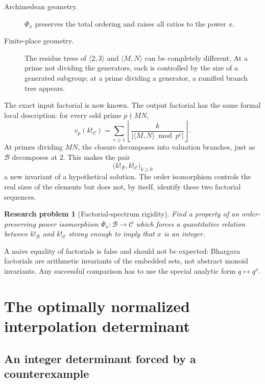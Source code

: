\documentclass[11pt,oneside]{article}
\newtheorem{problem}[theorem]{Research problem}
\theoremstyle{definition}
\theoremstyle{remark}
\newcommand{\B}{\mathcal B}
\newcommand{\Cout}{\mathcal C}
\newcommand{\floor}[1]{\left\lfloor #1\right\rfloor}
\begin{document}
\begin{description}
\item[Archimedean geometry.] \(\Phi_x\) preserves the total ordering and raises all ratios to
the power \(x\).
\item[Finite-place geometry.] The residue trees of \(\langle2,3\rangle\) and
\(\langle M,N\rangle\) can be completely different.  At a prime not dividing the generators,
each is controlled by the size of a generated subgroup; at a prime dividing a generator, a
ramified branch tree appears.
\end{description}

The exact input factorial is now known.  The output factorial has the same formal local
description:
for every odd prime \(p\nmid MN\),
\begin{equation}
 v_p(k!_{\Cout})
 =
 \sum_{e\ge1}
 \floor{\frac{k}{
 |\langle M,N\rangle\bmod p^e|}}.
 \label{eq:output-unramified}
\end{equation}
At primes dividing \(MN\), the closure decomposes into valuation branches, just as
\(\B\) decomposes at \(2\).  This makes the pair
\[
  \bigl(k!_{\B},k!_{\Cout}\bigr)_{k\ge0}
\]
a new invariant of a hypothetical solution.  The order isomorphism controls the real sizes of
the elements but does not, by itself, identify these two factorial sequences.

\begin{problem}[Factorial-spectrum rigidity]
\label{prob:factorial-spectrum}
Find a property of an order-preserving power isomorphism
\(\Phi_x:\B\to\Cout\) which forces a quantitative relation between
\(k!_{\B}\) and \(k!_{\Cout}\) strong enough to imply that \(x\) is an integer.
\end{problem}

A naive equality of factorials is false and should not be expected: Bhargava factorials are
arithmetic invariants of the embedded sets, not abstract monoid invariants.  Any successful
comparison has to use the special analytic form \(q\mapsto q^x\).

\section{The optimally normalized interpolation determinant}
\label{sec:normalized-determinant}

\subsection{An integer determinant forced by a counterexample}
\end{document}
